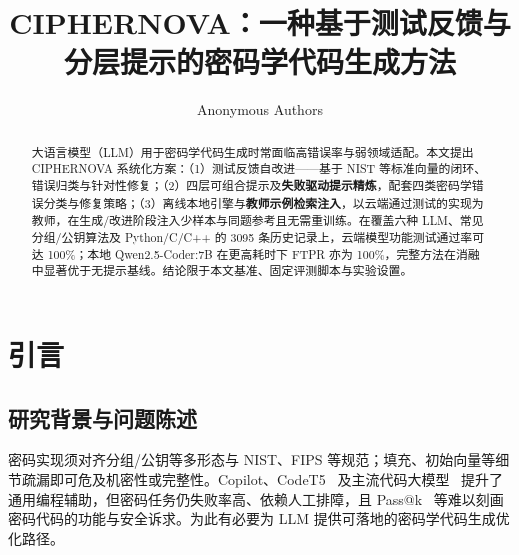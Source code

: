 \documentclass[runningheads]{llncs}
\begin{document}
\title{CIPHERNOVA：一种基于测试反馈与分层提示的密码学代码生成方法}

\newif\ifanonymized
\anonymizedtrue      %

\ifanonymized
\author{Anonymous Authors}
\else
\author{Jia-Yi He\inst{1,2} \and Xiao Lan\inst{2,1}\thanks{Corresponding author: lanxiao@scu.edu.cn}}
\institute{四川大学网络空间安全学院，成都，四川，中国\and
教育部四川大学数据防护与智能管理重点实验室，成都，四川，中国\\
\email{2022141500268@stu.scu.edu.cn, lanxiao@scu.edu.cn}}
\authorrunning{J.\ He and X.\ Lan}
\fi
\maketitle

\begin{abstract}
大语言模型（LLM）用于密码学代码生成时常面临高错误率与弱领域适配。本文提出 CIPHERNOVA 系统化方案：（1）测试反馈自改进——基于 NIST 等标准向量的闭环、错误归类与针对性修复；（2）四层可组合提示及\textbf{失败驱动提示精炼}，配套四类密码学错误分类与修复策略；（3）离线本地引擎与\textbf{教师示例检索注入}，以云端通过测试的实现为教师，在生成/改进阶段注入少样本与同题参考且无需重训练。在覆盖六种 LLM、常见分组/公钥算法及 Python/C/C++ 的 3095 条历史记录上，云端模型功能测试通过率可达 100\%；本地 Qwen2.5-Coder:7B 在更高耗时下 FTPR 亦为 100\%，完整方法在消融中显著优于无提示基线。结论限于本文基准、固定评测脚本与实验设置。
\end{abstract}


\section{引言}
\subsection{研究背景与问题陈述}
密码实现须对齐分组/公钥等多形态与 NIST、FIPS 等规范；填充、初始向量等细节疏漏即可危及机密性或完整性。Copilot、CodeT5~\cite{codet5} 及主流代码大模型~\cite{codex,codellama,deepseekcoder,starcoder} 提升了通用编程辅助，但密码任务仍失败率高、依赖人工排障，且 Pass@k~\cite{codex} 等难以刻画密码代码的功能与安全诉求。为此有必要为 LLM 提供可落地的密码学代码生成优化路径。
\end{document}

